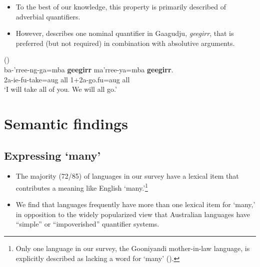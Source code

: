 \documentclass{article}
\makeatletter
\newcommand{\ofy}{/85} %
\makeatother
\begin{document}
\begin{itemize}
\item To the best of our knowledge, this property is primarily described of adverbial quantifiers. \item However, \cite{harvey92} describes one nominal quantifier in Gaagudju, {\it geegirr}, that is preferred (but not required) in combination with absolutive arguments.
\end{itemize}

\begin{exe}
   (\citealt[307]{harvey92})\\
  \gll ba-'rree-ng-ga=mba \textbf{geegirr} ma'rree-ya=mba \textbf{geegirr}.\\ 
  2{\sc a-ie-fu}-take={\sc aug} all 1+2{\sc a}-go.{\sc fu=aug} all\\
  \glt `I will take all of you. We will all go.'
\end{exe}


\section{Semantic findings}
\label{sec:semfind}

\subsection{Expressing `many'}
\begin{itemize}
\item The majority (72\ofy) of languages in our survey have a lexical item that  contributes a meaning like English `many.'\footnote{Only one language in our survey, the Gooniyandi mother-in-law language, is explicitly described as lacking a word for `many' (\citealt[636]{mcgregor89}).}
\item We find that languages frequently have more than one lexical item for `many,' in opposition to the widely popularized view that Australian languages have ``simple'' or ``impoverished'' quantifier systems.
\end{itemize}
\end{document}
